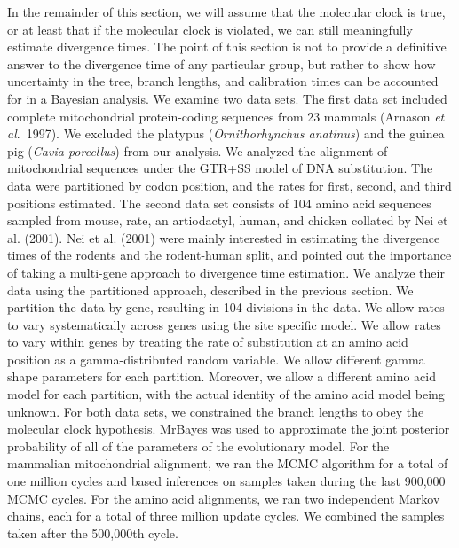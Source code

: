 \documentclass{svmult}
\begin{document}
In the remainder of this section, we will assume that the molecular clock is true, or at least that if the molecular clock is violated, we can still meaningfully estimate divergence
times. The point of this section is not to provide a definitive answer to the divergence time of any particular group, but rather to show how uncertainty in the tree, 
branch lengths, and calibration times can be accounted for in a Bayesian analysis. We examine two data sets. The first 
data set included complete
mitochondrial protein-coding sequences from 23 mammals ({\sc Arnason} {\it et al}.\ 1997). We excluded the platypus ({\it Ornithorhynchus anatinus}) and the
guinea pig ({\it Cavia porcellus}) from our analysis. We analyzed the alignment of mitochondrial sequences under the GTR+SS model of DNA substitution. The
data were partitioned by codon position, and the rates for first, second, and third positions estimated. The second data set consists of 104 amino acid sequences sampled from
mouse, rate, an artiodactyl, human, and chicken
collated by Nei et al. (2001). Nei et al. (2001) were mainly interested in estimating the divergence times of the rodents and the rodent-human split, and pointed out the
importance of taking a multi-gene approach to divergence time estimation. We analyze their data using the partitioned approach, described in the previous section. We
partition the data by gene, resulting in 104 divisions in the data. We allow rates to vary systematically across genes using the site specific model. We allow rates to
vary within genes by treating the rate of substitution at an amino acid position as a gamma-distributed random variable. We allow different gamma shape parameters
for each partition. Moreover, we allow a different amino acid model for each partition, with the actual identity of the amino acid model being unknown.
For both data sets, we constrained the branch lengths to obey the molecular clock hypothesis. MrBayes was used to approximate the joint posterior probability of
all of the parameters of the evolutionary model. For the mammalian mitochondrial alignment, we ran the MCMC algorithm for a total of one million cycles and based
inferences on samples taken during the last 900,000 MCMC cycles. For the amino acid alignments, we ran two independent Markov chains, each for a total of three
million update cycles. We combined the samples taken after the 500,000th cycle.
\end{document}
